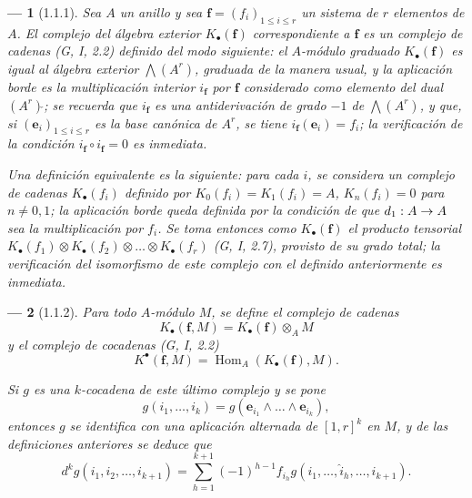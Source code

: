 \documentclass[10pt,oneside,openany]{book}
\theoremstyle{egaenv}\newtheorem*{env}{---}
\theoremstyle{egastatement}
\theoremstyle{egadescription}
\renewcommand{\leq}{\leqslant}
\renewcommand{\to}{\mathchoice{\longrightarrow}{\rightarrow}{\rightarrow}{\rightarrow}}
\begin{document}
\begin{env}[1.1.1]
\label{III.1.1.1}
\label{III.1.1.1-fr}
Sea $A$ un anillo y sea $\mathbf f=(f_i)_{1\leq i\leq r}$ un sistema de $r$ elementos de $A$.
El \emph{complejo del álgebra exterior $K_\bullet(\mathbf f)$} correspondiente a $\mathbf f$ es un complejo de cadenas (G, I, 2.2) definido del modo siguiente: el $A$-módulo graduado $K_\bullet(\mathbf f)$ es igual al \emph{álgebra exterior $\bigwedge(A^r)$}, graduada de la manera usual, y la aplicación borde es la \emph{multiplicación interior $i_{\mathbf f}$} por $\mathbf f$ considerado como elemento del dual $(A^r)\check{}$; se recuerda que $i_{\mathbf f}$ es una \emph{antiderivación} de grado $-1$ de $\bigwedge(A^r)$, y que, si $(\mathbf e_i)_{1\leq i\leq r}$ es la base canónica de $A^r$, se tiene $i_{\mathbf f}(\mathbf e_i)=f_i$; la verificación de la condición $i_{\mathbf f}\circ i_{\mathbf f}=0$ es inmediata.

Una definición equivalente es la siguiente: para cada $i$, se considera un complejo de cadenas $K_\bullet(f_i)$ definido por $K_0(f_i)=K_1(f_i)=A$, $K_n(f_i)=0$ para $n\neq0,1$; la aplicación borde queda definida por la condición de que $d_1:A\to A$ sea la \emph{multiplicación por $f_i$}.
Se toma entonces como $K_\bullet(\mathbf f)$ el \emph{producto tensorial $K_\bullet(f_1)\otimes K_\bullet(f_2)\otimes\ldots\otimes K_\bullet(f_r)$} (G, I, 2.7), provisto de su grado total; la verificación del isomorfismo de este complejo con el definido anteriormente es inmediata.
\end{env}

\begin{env}[1.1.2]
\label{III.1.1.2}
\label{III.1.1.2-fr}
Para todo $A$-módulo $M$, se define el \emph{complejo de cadenas}
\begin{equation}
\label{III.1.1.2.1-fr}
\tag{1.1.2.1}
K_\bullet(\mathbf f,M)=K_\bullet(\mathbf f)\otimes_A M
\end{equation}
y el \emph{complejo de cocadenas} (G, I, 2.2)
\begin{equation}
\label{III.1.1.2.2-fr}
\tag{1.1.2.2}
K^\bullet(\mathbf f,M)=\operatorname{Hom}_A(K_\bullet(\mathbf f),M).
\end{equation}

Si $g$ es una $k$-cocadena de este último complejo y se pone
\[
g(i_1,\ldots,i_k)=g(\mathbf e_{i_1}\wedge\ldots\wedge\mathbf e_{i_k}),
\]
entonces $g$ se identifica con una aplicación \emph{alternada} de $[1,r]^k$ en $M$, y de las definiciones anteriores se deduce que
\begin{equation}
\label{III.1.1.2.3-fr}
\tag{1.1.2.3}
d^kg(i_1,i_2,\ldots,i_{k+1})=
\sum_{h=1}^{k+1}(-1)^{h-1}f_{i_h}
g(i_1,\ldots,\widehat{i}_h,\ldots,i_{k+1}).
\end{equation}
\end{env}
\end{document}
